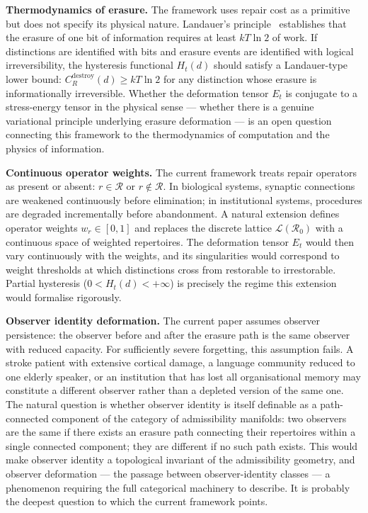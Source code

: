 \documentclass[12pt, oneside]{article}
\theoremstyle{plain}
\theoremstyle{definition}
\theoremstyle{remark}
\newcommand{\CR}{C_{\!R}}
\newcommand{\Rzero}{\mathcal{R}_0}
\newcommand{\Et}{E_t}
\newcommand{\Hyster}{H}
\begin{document}
\medskip\noindent
\textbf{Thermodynamics of erasure.}\;
The framework uses repair cost as a primitive but does not
specify its physical nature.
Landauer's principle~\cite{Landauer1961} establishes that the
erasure of one bit of information requires at least $kT \ln 2$
of work.
If distinctions are identified with bits and erasure events are
identified with logical irreversibility, the hysteresis functional
$\Hyster_t(d)$ should satisfy a Landauer-type lower bound:
$\CR^{\mathrm{destroy}}(d) \geq kT \ln 2$ for any distinction
whose erasure is informationally irreversible.
Whether the deformation tensor $\Et$ is conjugate to a
stress-energy tensor in the physical sense --- whether there is
a genuine variational principle underlying erasure deformation
--- is an open question connecting this framework to the
thermodynamics of computation and the physics of information.

\medskip\noindent
\textbf{Continuous operator weights.}\;
The current framework treats repair operators as present or
absent: $r \in \mathcal{R}$ or $r \notin \mathcal{R}$.
In biological systems, synaptic connections are weakened
continuously before elimination; in institutional systems,
procedures are degraded incrementally before abandonment.
A natural extension defines operator weights $w_r \in [0, 1]$
and replaces the discrete lattice $\mathcal{L}(\Rzero)$ with a
continuous space of weighted repertoires.
The deformation tensor $\Et$ would then vary continuously with
the weights, and its singularities would correspond to weight
thresholds at which distinctions cross from restorable to
irrestorable.
Partial hysteresis ($0 < \Hyster_t(d) < +\infty$) is precisely
the regime this extension would formalise rigorously.

\medskip\noindent
\textbf{Observer identity deformation.}\;
The current paper assumes observer persistence: the observer
before and after the erasure path is the same observer with
reduced capacity.
For sufficiently severe forgetting, this assumption fails.
A stroke patient with extensive cortical damage, a language
community reduced to one elderly speaker, or an institution that
has lost all organisational memory may constitute a different
observer rather than a depleted version of the same one.
The natural question is whether observer identity is itself
definable as a path-connected component of the category of
admissibility manifolds: two observers are the same if there
exists an erasure path connecting their repertoires within a
single connected component; they are different if no such path
exists.
This would make observer identity a topological invariant of the
admissibility geometry, and observer deformation --- the passage
between observer-identity classes --- a phenomenon requiring the
full categorical machinery to describe.
It is probably the deepest question to which the current
framework points.
\end{document}
